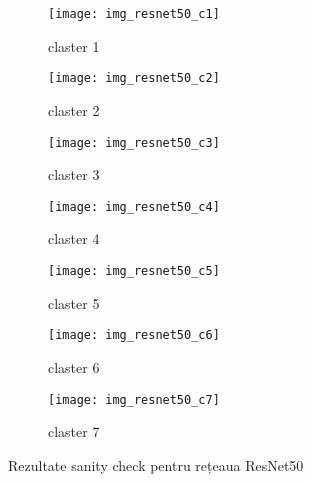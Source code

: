 \begin{figure}[!tbp]
  \centering
  \begin{subfigure}[b]{0.45\textwidth}
    \texttt{[image: img\_resnet50\_c1]}
    \caption{claster 1}
  \end{subfigure}
  \hfill
  \begin{subfigure}[b]{0.45\textwidth}
    \texttt{[image: img\_resnet50\_c2]}
    \caption{claster 2}
  \end{subfigure}
   \hfill
  \begin{subfigure}[b]{0.45\textwidth}
    \texttt{[image: img\_resnet50\_c3]}
    \caption{claster 3}
  \end{subfigure}
  \hfill
  \begin{subfigure}[b]{0.45\textwidth}
    \texttt{[image: img\_resnet50\_c4]}
    \caption{claster 4}
  \end{subfigure}
  \hfill
  \begin{subfigure}[b]{0.45\textwidth}
    \texttt{[image: img\_resnet50\_c5]}
    \caption{claster 5}
  \end{subfigure}
  \hfill
  \begin{subfigure}[b]{0.45\textwidth}
    \texttt{[image: img\_resnet50\_c6]}
    \caption{claster 6}
  \end{subfigure}
    \hfill
  \begin{subfigure}[b]{0.45\textwidth}
    \texttt{[image: img\_resnet50\_c7]}
    \caption{claster 7}
  \end{subfigure}
  \caption[Rezultate sanity check pentru rețeaua ResNet50]{Rezultate sanity check pentru rețeaua ResNet50}
\end{figure}

